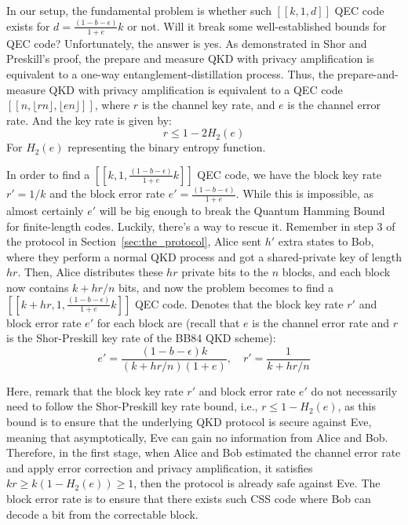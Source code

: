 \documentclass[%
 reprint,
superscriptaddress,
 amsmath,amssymb,
 aps,
]{revtex4-2}
\begin{document}
In our setup, the fundamental problem is whether such $[[k, 1, d]]$ QEC code exists for $d=\frac{(1-b-\epsilon)}{1+e}k$ or not. Will it break some well-established bounds for QEC code? Unfortunately, the answer is yes. As demonstrated in Shor and Preskill's proof, the prepare and measure QKD with privacy amplification is equivalent to a one-way entanglement-distillation process. Thus, the prepare-and-measure QKD with privacy amplification is equivalent to a QEC code $[[n, \lfloor rn\rfloor, \lfloor en\rfloor]]$, where $r$ is the channel key rate, and $e$ is the channel error rate. And the key rate is given by:
\begin{equation}
    r\le 1-2H_2(e)
\end{equation}
For $H_2(e)$ representing the binary entropy function.

In order to find a $[[k, 1,\frac{(1-b-\epsilon)}{1+e}k]]$ QEC code, we have the block key rate $r'=1/k$ and the block error rate $e'=\frac{(1-b-\epsilon)}{1+e}$. While this is impossible, as almost certainly $e'$ will be big enough to break the Quantum Hamming Bound for finite-length codes. Luckily, there's a way to rescue it. Remember in step 3 of the protocol in Section~\ref{sec:the_protocol}, Alice sent $h'$ extra states to Bob, where they perform a normal QKD process and got a shared-private key of length $hr$. Then, Alice distributes these $hr$ private bits to the $n$ blocks, and each block now contains $k+hr/n$ bits, and now the problem becomes to find a $[[k+hr, 1, \frac{(1-b-\epsilon)}{1+e}k]]$ QEC code. Denotes that the block key rate $r'$ and block error rate $e'$ for each block are (recall that $e$ is the channel error rate and $r$ is the Shor-Preskill key rate of the BB84 QKD scheme):
\begin{equation}
    e'=\frac{(1-b-\epsilon)k}{(k+hr/n)(1+e)}, \quad r'=\frac{1}{k+hr/n}
\end{equation}

Here, remark that the block key rate $r'$ and block error rate $e'$ do not necessarily need to follow the Shor-Preskill key rate bound, i.e., $r\le 1-H_2(e)$, as this bound is to ensure that the underlying QKD protocol is secure against Eve, meaning that asymptotically, Eve can gain no information from Alice and Bob. Therefore, in the first stage, when Alice and Bob estimated the channel error rate and apply error correction and privacy amplification, it satisfies $kr\ge k(1-H_2(e))\ge1$, then the protocol is already safe against Eve. The block error rate is to ensure that there exists such CSS code where Bob can decode a bit from the correctable block.
\end{document}
